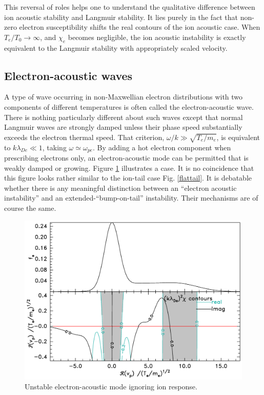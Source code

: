 \documentclass[12pt]{article}
\begin{document}
This reversal of
roles helps one to understand the qualitative difference between ion
acoustic stability and Langmuir stability. It lies purely in the fact
that non-zero electron susceptibility shifts the real contours of the
ion acoustic case. When $T_e/T_0\to\infty$, and $\chi_e$ becomes
negligible, the ion acoustic instability is exactly equivalent to the
Langmuir stability with appropriately scaled velocity.


\subsection{Electron-acoustic waves}

A type of wave occurring in non-Maxwellian electron distributions with
two components of different temperatures is often called the
electron-acoustic wave. There is nothing particularly different about
such waves except that normal Langmuir waves are strongly damped
unless their phase speed substantially exceeds the electron thermal
speed. That criterion, $\omega/k\gg \sqrt{T_e/m_e}$, is equivalent to
$k\lambda_{De}\ll 1$, taking $\omega\simeq \omega_{pe}$. By adding a
hot electron component when prescribing electrons only, an
electron-acoustic mode can be permitted that is weakly damped or
growing. Figure \ref{fig:eamode2} illustrates a case. It is no
coincidence that this figure looks rather similar to the ion-tail case
Fig. \ref{flattail}. It is debatable whether there is any meaningful
distinction between an ``electron acoustic instability'' and an
extended-``bump-on-tail'' instability. Their mechanisms are of course the
same. 

\begin{figure}[htp]
  \centering
  \includegraphics[width=.7\hsize]{eamode2}
  \caption{Unstable electron-acoustic mode ignoring ion response.}
  \label{fig:eamode2}
\end{figure}
\end{document}
